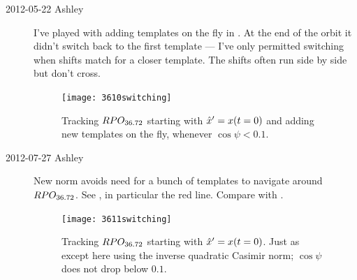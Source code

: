 \begin{description}
\item[2012-05-22 Ashley]
 I've played with adding templates on the fly in
 .  At the end of the orbit
 it didn't switch back to the first template --- I've only permitted
 switching when shifts match for a closer template.  The shifts
 often run side by side but don't cross.
 \begin{figure}
 \begin{center}
  \texttt{[image: 3610switching]}
 \end{center}
 \caption{ \label{fig:3610switching}
    Tracking $RPO_{36.72}$ starting with ${\hat{x}'}{}=x(t=0)$ and
    adding new templates on the fly, whenever $\cos\psi<0.1$.
 }
 \end{figure}

\item[2012-07-27 Ashley]
New norm avoids need for a bunch of templates
to navigate around $RPO_{36.72}$.  See ,
in particular the red line.  Compare with .
 \begin{figure}
 \begin{center}
  \texttt{[image: 3611switching]}
 \end{center}
 \caption{ \label{fig:3611switching}
    Tracking $RPO_{36.72}$ starting with ${\hat{x}'}{}=x(t=0)$.
    Just as  except here using the inverse
    quadratic Casimir norm;
    $\cos\psi$ does not drop below $0.1$.
 }
 \end{figure}

\end{description}
